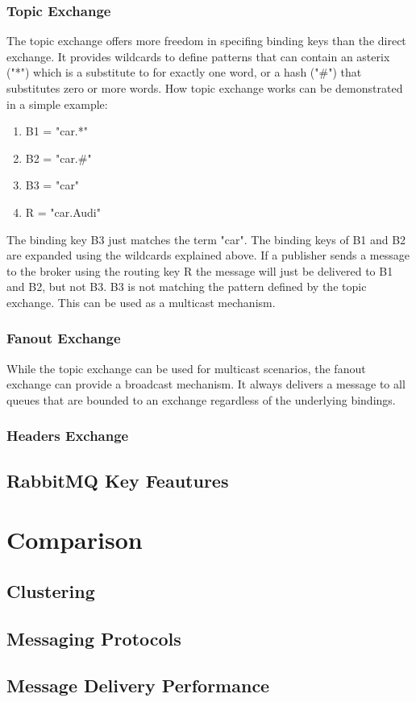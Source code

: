 \subsubsection{Topic Exchange}
The topic exchange offers more freedom in specifing binding keys than the direct exchange. It provides wildcards to define patterns that can contain an asterix ("*") which is a substitute to for exactly one word, or a hash ("\#") that substitutes zero or more words. How topic exchange works can be demonstrated in a simple example:
\begin{enumerate}
	\item B1 = "car.*"
	\item B2 = "car.\#"
	\item B3 = "car"
	\item R = "car.Audi"
\end{enumerate}
The binding key B3 just matches the term "car". The binding keys of B1 and B2 are expanded using the wildcards explained above. If a publisher sends a message to the broker using the routing key R the message will just be delivered to B1 and B2, but not B3. B3 is not matching the pattern defined by the topic exchange. This can be used as a multicast mechanism.

\subsubsection{Fanout Exchange}
While the topic exchange can be used for multicast scenarios, the fanout exchange can provide a broadcast mechanism. It always delivers a message to all queues that are bounded to an exchange regardless of the underlying bindings.

\subsubsection{Headers Exchange}



\subsection{RabbitMQ Key Feautures}


\section{Comparison}

\subsection{Clustering}

\subsection{Messaging Protocols}

\subsection{Message Delivery Performance}

